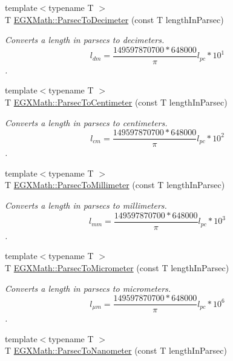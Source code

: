 \begin{DoxyCompactItemize}
{\footnotesize template$<$typename T $>$ }\\T \mbox{\hyperlink{group___e_g_x_math-_conversions-_length_conversions-_astronomical-_parsec-_s_i_gaedc7b871291866977df575d69f7eaf6f}{E\+G\+X\+Math\+::\+Parsec\+To\+Decimeter}} (const T length\+In\+Parsec)
\begin{DoxyCompactList}\small\item\em Converts a length in parsecs to decimeters. \[ l_{dm}=\frac{149597870700 * 648000}{\pi}l_{pc} * 10^{1} \]. \end{DoxyCompactList}\item 
{\footnotesize template$<$typename T $>$ }\\T \mbox{\hyperlink{group___e_g_x_math-_conversions-_length_conversions-_astronomical-_parsec-_s_i_ga87c7cdc557184f0451717a0bf04e9d38}{E\+G\+X\+Math\+::\+Parsec\+To\+Centimeter}} (const T length\+In\+Parsec)
\begin{DoxyCompactList}\small\item\em Converts a length in parsecs to centimeters. \[ l_{cm}=\frac{149597870700 * 648000}{\pi}l_{pc} * 10^{2} \]. \end{DoxyCompactList}\item 
{\footnotesize template$<$typename T $>$ }\\T \mbox{\hyperlink{group___e_g_x_math-_conversions-_length_conversions-_astronomical-_parsec-_s_i_ga5ea5a5b0860b6c6ad260425079db2ee2}{E\+G\+X\+Math\+::\+Parsec\+To\+Millimeter}} (const T length\+In\+Parsec)
\begin{DoxyCompactList}\small\item\em Converts a length in parsecs to millimeters. \[ l_{mm}=\frac{149597870700 * 648000}{\pi}l_{pc} * 10^{3} \]. \end{DoxyCompactList}\item 
{\footnotesize template$<$typename T $>$ }\\T \mbox{\hyperlink{group___e_g_x_math-_conversions-_length_conversions-_astronomical-_parsec-_s_i_ga1eea34f6cb4b5a7b5dec1cd75863f191}{E\+G\+X\+Math\+::\+Parsec\+To\+Micrometer}} (const T length\+In\+Parsec)
\begin{DoxyCompactList}\small\item\em Converts a length in parsecs to micrometers. \[ l_{\mu m}=\frac{149597870700 * 648000}{\pi}l_{pc} * 10^{6} \]. \end{DoxyCompactList}\item 
{\footnotesize template$<$typename T $>$ }\\T \mbox{\hyperlink{group___e_g_x_math-_conversions-_length_conversions-_astronomical-_parsec-_s_i_gab2226196e39edbba8fe0862d0fd75870}{E\+G\+X\+Math\+::\+Parsec\+To\+Nanometer}} (const T length\+In\+Parsec)

\end{DoxyCompactItemize}
